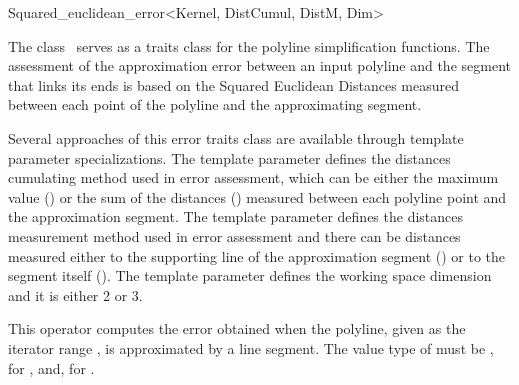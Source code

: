 
\begin{ccRefClass}{Squared_euclidean_error<Kernel, DistCumul, DistM, Dim>}

\ccDefinition
  
The class \ccRefName\ serves as a traits class for the polyline
simplification functions.
The assessment of the approximation error between an input polyline and
the segment that links its ends is based on the Squared Euclidean
Distances measured between each point of the polyline and the
approximating segment.

Several approaches of this error traits class are available through
template parameter specializations. The  template parameter
defines the distances cumulating method used in error assessment,
which can be either the maximum value () or the sum of the distances
()
measured between each polyline point and the approximation segment.
The  template parameter defines the distances measurement method used
in error assessment and there can be distances measured either to the
supporting line of the approximation segment () or to the 
segment itself (). The  template parameter defines the working space dimension
and it is either 2 or 3.





\ccIsModel



\ccTypes
{}
\ccOperations

{This operator computes the error obtained when the polyline, given as the iterator range \ccc{[begin, beyond)}, 
is approximated by a line segment. The value type of  must be , for ,
and, for . }


\end{ccRefClass}
